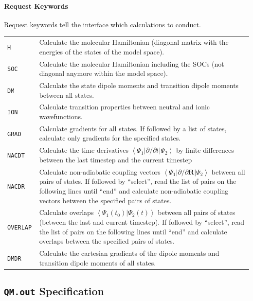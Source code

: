 \documentclass[a4paper,11pt,DIV=15,openany,twoside=false]{scrbook}
\newcommand{\ttt}[1]{\textbf{\texttt{#1}}}
\begin{document}
\paragraph{Request Keywords}

Request keywords tell the interface which calculations to conduct.

\begin{tabular}{>{\tt}lp{9cm}}
H               &Calculate the molecular Hamiltonian (diagonal matrix with the energies of the states of the model space).\\
SOC             &Calculate the molecular Hamiltonian including the SOCs (not diagonal anymore within the model space).\\
DM              &Calculate the state dipole moments and transition dipole moments between all states.\\
ION             &Calculate transition properties between neutral and ionic wavefunctions.\\
GRAD            &Calculate gradients for all states. If followed by a list of states, calculate only gradients for the specified states.\\
NACDT           &Calculate the time-derivatives $\left\langle\Psi_1|\partial/\partial t|\Psi_2\right\rangle$ by finite differences between the last timestep and the current timestep\\
NACDR           &Calculate non-adiabatic coupling vectors $\left\langle\Psi_1|\partial/\partial \mathbf{R}|\Psi_2\right\rangle$ between all pairs of states. If followed by ``select'', read the list of pairs on the following lines until ``end'' and calculate non-adiabatic coupling vectors between the specified pairs of states.\\
OVERLAP         &Calculate overlaps $\left\langle\Psi_1(t_0)|\Psi_2(t)\right\rangle$ between all pairs of states (between the last and current timestep). If followed by ``select'', read the list of pairs on the following lines until ``end'' and calculate overlaps between the specified pairs of states.\\
DMDR            &Calculate the cartesian gradients of the dipole moments and transition dipole moments of all states.\\
\end{tabular}

\subsection{\ttt{QM.out} Specification}\label{intf:qmout}
\end{document}
